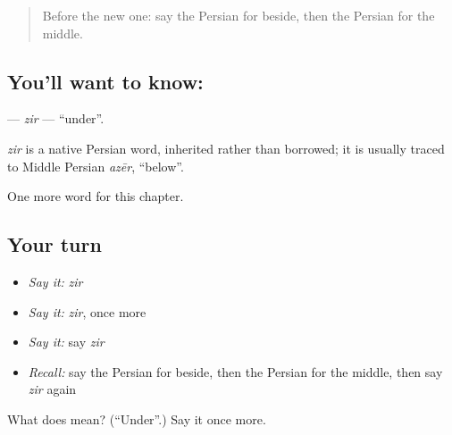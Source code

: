 \label{lesson:FA-C85-zir}



\begin{quote}
Before the new one: say the Persian for beside, then the Persian for the middle.
\end{quote}

\subsection*{You'll want to know: }
\textbf{} — \emph{zir} — \textquotedblleft{}under\textquotedblright{}.

\begin{cousinweb}
\emph{zir} is a native Persian word, inherited rather than borrowed; it is usually traced to Middle Persian \emph{azēr}, \textquotedblleft{}below\textquotedblright{}.
\end{cousinweb}

\begin{grammarlens}[title={What you've built}]
One more word for this chapter.
\end{grammarlens}

\subsection*{Your turn}
\begin{itemize}
\raggedright
  \item \emph{Say it:} \emph{zir}
  \item \emph{Say it:} \emph{zir}, once more
  \item \emph{Say it:} say \emph{zir}
  \item \emph{Recall:} say the Persian for beside, then the Persian for the middle, then say \emph{zir} again
\end{itemize}

\begin{tcolorbox}[breakable,colback=teal!4,colframe=teal!35!black,title={Before you move on}]
What does  mean? (\textquotedblleft{}Under\textquotedblright{}.) Say it once more.
\end{tcolorbox}
